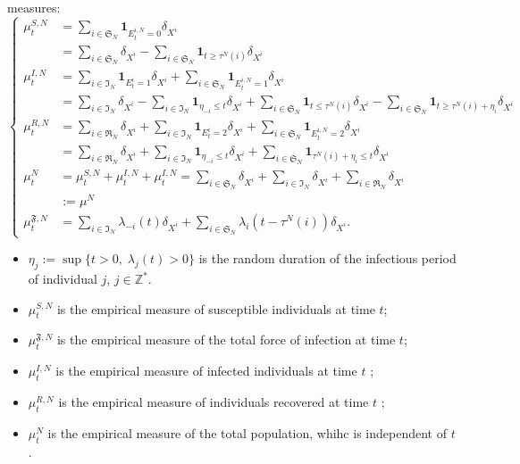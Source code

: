 \documentclass[notitlepage,reqno,11pt]{amsart}
\numberwithin{equation}{section}
\begin{document}
measures:
\begin{equation}
\label{equa1}
\left\lbrace
\begin{aligned}
\mu_t^{S,N} &= \sum_{i\in\mathfrak{S}_N} \mathbf{1}_{E_{t}^{i,N}=0}\delta_{X^{i}}\\
&=\sum_{i\in\mathfrak{S}_N} \delta_{X^{i}}- \sum_{i\in\mathfrak{S}_N} \mathbf{1}_{t\geq \tau^N(i)}\delta_{X^{i}}\\
\mu_t^{I,N}&=\sum_{i\in\mathfrak{I}_N} \mathbf{1}_{E_{t}^{i}=1}\delta_{X^{i}}+  \sum_{i\in\mathfrak{S}_N} \mathbf{1}_{E_{t}^{i,N}=1}\delta_{X^{i}}\\
&=\sum_{i\in\mathfrak{I}_N} \delta_{X^{i}}- \sum_{i\in\mathfrak{I}_N} \mathbf{1}_{\eta_{-i}\leq  t}\delta_{X^{i}}+\sum_{i\in\mathfrak{S}_N} \mathbf{1}_{t\leq \tau^N(i)}\delta_{X^{i}}-
\sum_{i\in\mathfrak{S}_N} \mathbf{1}_{ t \geq \tau^N(i)+ \eta_i  }\delta_{X^{i}}\\
\mu_t^{R,N}&=\sum_{i\in\mathfrak{R}_N} \delta_{X^{i}}+\sum_{i\in\mathfrak{I}_N} \mathbf{1}_{E_{t}^{i}=2}\delta_{X^{i}}+  \sum_{i\in\mathfrak{S}_N} \mathbf{1}_{E_{t}^{i,N}=2}\delta_{X^{i}}\\
&=\sum_{i\in\mathfrak{R}_N} \delta_{X^{i}}+\sum_{i\in\mathfrak{I}_N} \mathbf{1}_{\eta_{-i}\leq t}\delta_{X^{i}}+\sum_{i\in\mathfrak{S}_N} \mathbf{1}_{ \tau^N(i)+ \eta_i \leq t }\delta_{X^{i}}\\
\mu_t^{N}&= \mu_t^{S,N}+\mu_t^{I,N}+\mu_t^{I,N}=\sum_{i\in\mathfrak{S}_N} \delta_{X^{i}}+ \sum_{i\in\mathfrak{I}_N}\delta_{X^{i}} + \sum_{i\in\mathfrak{R}_N}\delta_{X^{i}}\\
&:=\mu^{N}\\
\mu_t^{\mathfrak{F},N} &=  \sum_{i\in\mathfrak{I}_N} \lambda_{-i}(t)\delta_{X^{i}} +  \sum_{i\in\mathfrak{S}_N} \lambda_{i}(t- \tau^N(i))\delta_{X^{i}}.
	\end{aligned}
\right.
\end{equation}
\begin{itemize}
          \item $\eta_j := \sup\{t > 0,\;\lambda_{j}(t) > 0\}$ is the random duration of  the infectious period of individual $j$, $j \in  \mathbb{Z}^*$.
	\item $\mu_t^{S,N}$ is the empirical measure of susceptible individuals at time $t$;
	\item $\mu_t^{\mathfrak{F},N}$ is the empirical measure of the total force of infection at time $t$;
	\item $\mu_t^{I,N}$  is the empirical measure of infected individuals at time $t$ ;
	\item $\mu_t^{R,N}$ is the empirical measure of individuals recovered at time $t$ ;
	\item $\mu_t^{N}$ is the empirical measure of the total population, whihc is independent of $t$.
\end{itemize}
\end{document}
